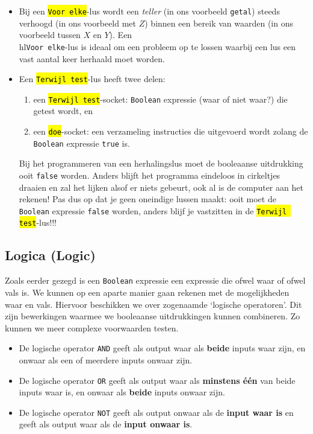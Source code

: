 
\begin{itemize}
	\item Bij een \hl{\texttt{Voor elke}}-lus wordt een \emph{teller} (in ons voorbeeld \texttt{getal}) steeds verhoogd (in ons voorbeeld met $Z$) binnen een bereik van waarden (in ons voorbeeld tussen $X$ en $Y$). Een \\hl{\texttt{Voor elke}}-lus is ideaal om een probleem op te lossen waarbij een lus een vast aantal keer herhaald moet worden.

	\item Een \hl{\texttt{Terwijl test}}-lus heeft twee delen: 
	\begin{enumerate}
		\item een \hl{\texttt{Terwijl test}}-socket: \texttt{Boolean} expressie (waar of niet waar?) die getest wordt, en 
		\item een \hl{\texttt{doe}}-socket: een verzameling instructies die uitgevoerd wordt zolang de \texttt{Boolean} expressie \texttt{true} is.
	\end{enumerate}
	Bij het programmeren van een herhalingslus moet de booleaanse uitdrukking ooit \texttt{false} worden. Anders blijft het programma eindeloos in cirkeltjes draaien en zal het lijken alsof er niets gebeurt, ook al is de computer aan het rekenen!
	Pas dus op dat je geen oneindige lussen maakt: ooit moet de \texttt{Boolean} expressie \texttt{false} worden, anders blijf je vastzitten in de \hl{\texttt{Terwijl test}}-lus!!!
\end{itemize}

\subsection{Logica (Logic)}

Zoals eerder gezegd is een \texttt{Boolean} expressie een expressie die ofwel waar of ofwel vals is.
We kunnen op een aparte manier gaan rekenen met de mogelijkheden waar en vals.
Hiervoor beschikken we over zogenaamde \textquoteleft logische operatoren\textquoteright. 
Dit zijn bewerkingen waarmee we booleaanse uitdrukkingen kunnen combineren.
Zo kunnen we meer complexe voorwaarden testen. 

\begin{itemize}
	\item De logische operator \texttt{AND} geeft als output waar als \textbf{beide} inputs waar zijn, en onwaar als een of meerdere inputs onwaar zijn. 

	\item De logische operator \texttt{OR} geeft als output waar als \textbf{minstens \'e\'en} van beide inputs waar is, en onwaar als \textbf{beide} inputs onwaar zijn.
	
	\item De logische operator \texttt{NOT} geeft als output onwaar als de \textbf{input waar is} en geeft als output waar als de \textbf{input onwaar is}.
\end{itemize}

